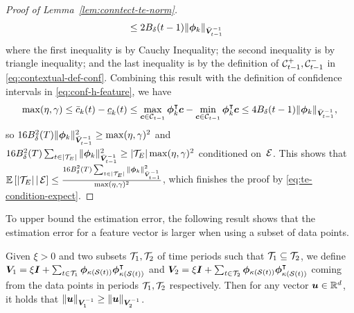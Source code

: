 \begin{proof}[Proof of Lemma~\ref{lem:conntect-te-norm}]
\begin{align*}
&\leq 2B_{\delta}(t-1)\|\boldsymbol{\phi}_k\|_{\bar{\boldsymbol{V}}_{t-1}^{-1}}
\end{align*}
where the first inequality is by Cauchy Inequality; the second inequality is by triangle inequality; and the last inequality is by the definition of $\mathcal{C}^+_{t-1}, \mathcal{C}^-_{t-1}$ in \eqref{eq:contextual-def-conf}.
Combining this result with the definition of confidence intervals in \eqref{eq:conf-h-feature}, we have
\[
\max(\eta,\gamma)\leq \bar{c}_k(t) - \underline{c}_k(t)
\leq \max_{\boldsymbol{c} \in \mathcal{C}_{t-1}} \boldsymbol{\phi}_k^{\intercal}\boldsymbol{c} - \min_{\boldsymbol{c} \in \mathcal{C}_{t-1}} \boldsymbol{\phi}_k^{\intercal}\boldsymbol{c} \leq 4B_{\delta}(t-1)\|\boldsymbol{\phi}_k\|_{\bar{\boldsymbol{V}}_{t-1}^{-1}},
\]
so $16B_{\delta}^2(T)\|\boldsymbol{\phi}_k\|_{\bar{\boldsymbol{V}}_{t-1}^{-1}}^2 \geq \max(\eta,\gamma)^2$ and  $16B_{\delta}^2(T)\sum_{t \in |\mathcal{T}_E|} \|\boldsymbol{\phi}_k\|_{\bar{\boldsymbol{V}}_{t-1}^{-1}}^2 \geq |\mathcal{T}_E|\max(\eta,\gamma)^2$ conditioned on~$\mathcal{E}$. This shows that $\mathbb E\left[|\mathcal{T}_E| \,\middle\vert\, \mathcal{E}\right] \leq \frac{16B_{\delta}^2(T)\sum_{t \in |\mathcal{T}_E|} \|\boldsymbol{\phi}_k\|_{\bar{\boldsymbol{V}}_{t-1}^{-1}}^2}{\max(\eta,\gamma)^2}$, which finishes the proof by \eqref{eq:te-condition-expect}.
\end{proof}
To upper bound the estimation error, the following result shows that the estimation error for a feature vector is larger when using a subset of data points.
\begin{lemma}\label{lem:norm-subset}
Given $\xi > 0$ and two subsets $\mathcal{T}_1,\mathcal{T}_2$ of time periods such that $\mathcal{T}_1 \subseteq \mathcal{T}_2$, we define $\boldsymbol{V}_1 = \xi \boldsymbol{I} + \sum_{t \in \mathcal{T}_1} \boldsymbol{\phi}_{\kappa(\mathcal{S}(t))}\boldsymbol{\phi}_{\kappa(\mathcal{S}(t))}^{\intercal}$ and $\boldsymbol{V}_2 = \xi \boldsymbol{I} + \sum_{t \in \mathcal{T}_2} \boldsymbol{\phi}_{\kappa(\mathcal{S}(t))}\boldsymbol{\phi}_{\kappa(\mathcal{S}(t))}^{\intercal}$ coming from the data points in periods $\mathcal{T}_1,\mathcal{T}_2$ respectively. Then for any vector $\boldsymbol{u} \in \mathbb{R}^d$, it holds that $\|\boldsymbol{u}\|_{\boldsymbol{V}_1^{-1}} \geq \|\boldsymbol{u}\|_{\boldsymbol{V}_2^{-1}}$.
\end{lemma}
